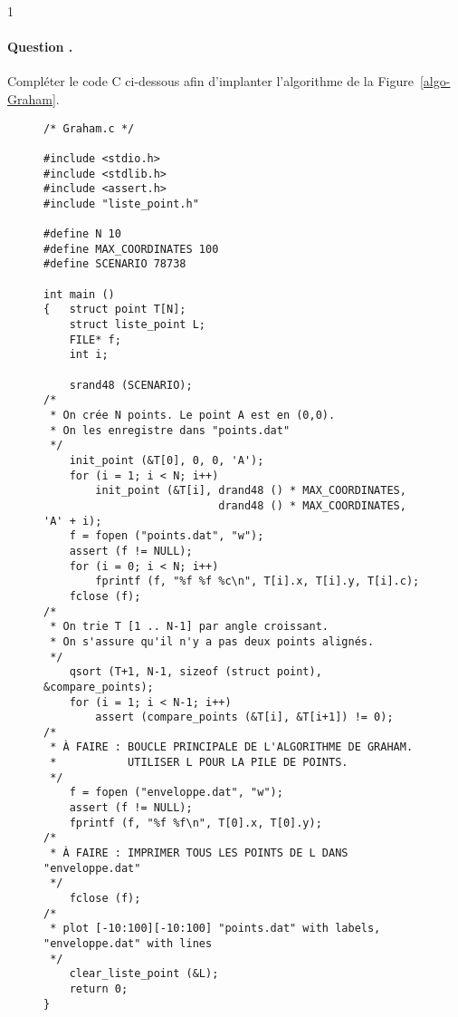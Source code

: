 \documentclass[11pt]{article}
\newcounter{question_counter}
\newcommand{\question}{\addtocounter{question_counter}1 %
    \paragraph{\bf Question \arabic{question_counter}.}}
\newcounter{points_counter}
\begin{document}
\question
Compléter le code C ci-dessous afin d'implanter l'algorithme
de la Figure~\ref{algo-Graham}.
\begin{figure}
\begin{Verbatim}[fontsize=\small,samepage=true]
/* Graham.c */

#include <stdio.h>
#include <stdlib.h>
#include <assert.h>
#include "liste_point.h"

#define N 10
#define MAX_COORDINATES 100
#define SCENARIO 78738

int main ()
{   struct point T[N];
    struct liste_point L;
    FILE* f;
    int i;

    srand48 (SCENARIO);
/* 
 * On crée N points. Le point A est en (0,0).
 * On les enregistre dans "points.dat"
 */
    init_point (&T[0], 0, 0, 'A');
    for (i = 1; i < N; i++)
        init_point (&T[i], drand48 () * MAX_COORDINATES,
                           drand48 () * MAX_COORDINATES, 'A' + i);
    f = fopen ("points.dat", "w");
    assert (f != NULL);
    for (i = 0; i < N; i++)
        fprintf (f, "%f %f %c\n", T[i].x, T[i].y, T[i].c);
    fclose (f);
/* 
 * On trie T [1 .. N-1] par angle croissant.
 * On s'assure qu'il n'y a pas deux points alignés.
 */
    qsort (T+1, N-1, sizeof (struct point), &compare_points);
    for (i = 1; i < N-1; i++)
        assert (compare_points (&T[i], &T[i+1]) != 0);
/*
 * À FAIRE : BOUCLE PRINCIPALE DE L'ALGORITHME DE GRAHAM.
 *           UTILISER L POUR LA PILE DE POINTS.
 */
    f = fopen ("enveloppe.dat", "w");
    assert (f != NULL);
    fprintf (f, "%f %f\n", T[0].x, T[0].y);
/*
 * À FAIRE : IMPRIMER TOUS LES POINTS DE L DANS "enveloppe.dat"
 */
    fclose (f);
/* 
 * plot [-10:100][-10:100] "points.dat" with labels, "enveloppe.dat" with lines
 */
    clear_liste_point (&L);
    return 0;
}
\end{Verbatim}
\end{figure}



\end{document}
